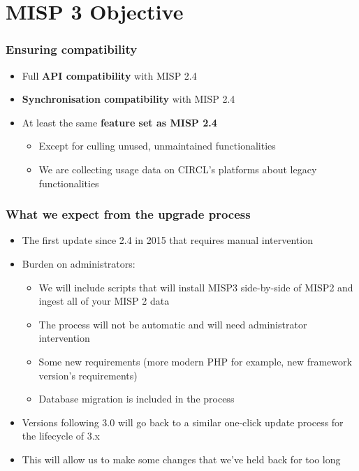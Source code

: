 \section{MISP 3 Objective}

\begin{frame}
  \frametitle{Ensuring compatibility}
  \begin{itemize}
     \item Full {\bf API compatibility} with MISP 2.4
     \item {\bf Synchronisation compatibility} with MISP 2.4
     \item At least the same {\bf feature set as MISP 2.4}
     \begin{itemize}
         \item Except for culling unused, unmaintained functionalities
         \item We are collecting usage data on CIRCL's platforms about legacy functionalities
     \end{itemize}
  \end{itemize}
\end{frame}

\begin{frame}
  \frametitle{What we expect from the upgrade process}
  \begin{itemize}
     \item The first update since 2.4 in 2015 that requires manual intervention
     \item Burden on administrators:
     \begin{itemize}
         \item We will include scripts that will install MISP3 side-by-side of MISP2 and ingest all of your MISP 2 data
         \item The process will not be automatic and will need administrator intervention
         \item Some new requirements (more modern PHP for example, new framework version's requirements)
         \item Database migration is included in the process
     \end{itemize}
     \item Versions following 3.0 will go back to a similar one-click update process for the lifecycle of 3.x
     \item This will allow us to make some changes that we've held back for too long
  \end{itemize}
\end{frame}

